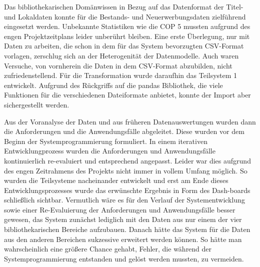 Das bibliothekarischen Domänwissen in Bezug auf das Datenformat der Titel- und Lokaldaten konnte
für die Bestands- und Neuerwerbungsdaten zielführend eingesetzt werden. Unbekannte Statistiken wie die \acrlong{COP 5} mussten aufgrund des engen Projektzeitplans leider unberührt bleiben.
Eine erste Überlegung, nur mit Daten zu arbeiten, die schon in dem für das System bevorzugten CSV-Format vorlagen, 
zerschlug sich an der Heterogenität der Datenmodelle. Auch waren Versuche, von vornherein die Daten in dem CSV-Format abzubilden, nicht zufriedenstellend.
Für die Transformation wurde daraufhin das Teilsystem 1 entwickelt.
Aufgrund des Rückgriffs auf die pandas Bibliothek, die viele Funktionen für die verschiedenen Dateiformate anbietet, konnte der Import aber sichergestellt werden.

Aus der Voranalyse der Daten und aus früheren Datenauswertungen wurden dann die Anforderungen und die Anwendungsfälle abgeleitet.
Diese wurden vor dem Beginn der Systemprogrammierung formuliert. In einem iterativen Entwicklungprozess wurden die Anforderungen und Anwendungsfälle kontinuierlich re-evaluiert und 
entsprechend angepasst. Leider war dies aufgrund des engen Zeitrahmens des Projekts nicht immer in vollem Umfang möglich. So wurden die Teilsysteme nacheinander entwickelt und
erst am Ende dieses Entwicklungsprozesses wurde das erwünschte Ergebnis in Form des Dash-boards schließlich sichtbar. Vermutlich wäre es für den Verlauf der Systementwicklung sowie einer
Re-Evaluierung der Anforderungen und Anwendungsfälle besser gewesen, das System zunächst lediglich mit den Daten aus nur einem der vier bibliothekarischen Bereiche
aufzubauen. Danach hätte das System für die Daten aus den anderen Bereichen sukzessive erweitert werden können. 
So hätte man wahrscheinlich eine größere Chance gehabt, Fehler, die während der Systemprogrammierung entstanden und gelöst werden mussten, zu vermeiden.



